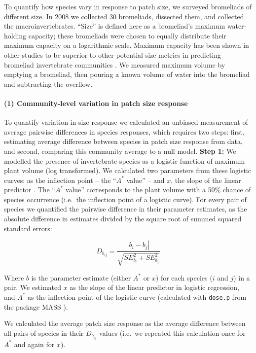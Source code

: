 To quantify how species vary in response to patch size, we surveyed
bromeliads of different size. In 2008 we collected 30 bromeliads,
dissected them, and collected the macroinvertebrates. “Size” is defined here as a bromeliad’s maximum water-holding capacity; these bromeliads
were chosen to equally distribute their maximum capacity on a logarithmic
scale. Maximum capacity has been shown in other
studies to be superior to other potential size metrics in predicting
bromeliad invertebrate communities \citep{Srivastava2008, Marino2011}.
We measured maximum volume by emptying a bromeliad, then pouring a known
volume of water into the bromeliad and subtracting the overflow.

\paragraph{(1) Community-level variation in patch size
response}\label{community-level-variation-in-patch-size-response}

To quantify variation in size response we calculated an unbiased
measurement of average pairwise differences in species responses, which
requires two steps: first, estimating average difference between species
in patch size response from data, and second, comparing this community
average to a null model. \textbf{Step 1:} We modelled the presence of
invertebrate species as a logistic function of maximum plant volume (log
transformed). We calculated two parameters from these logistic curves: as the inflection point -- the
``\(A^{*}\) value'' -- and \(x\), the slope of the linear predictor
\citep{Ovaskainen2003}. The ``\(A^{*}\) value'' corresponds to the plant
volume with a 50\% chance of species occurrence (i.e.~the inflection
point of a logistic curve). For every pair of species we quantified the
pairwise difference in their parameter estimates, as the absolute
difference in estimates divided by the square root of summed squared
standard errors:

\[D_{b_{ij}} = \frac{|b_{i} - b_{j}|}{\sqrt{SE_{b_{i}}^{2} + SE_{b_{j}}^{2}}}\]

Where \(b\) is the parameter estimate (either \(A^{*}\) or \(x\)) for
each species (\(i\) and \(j\)) in a pair. We estimated \(x\) as the
slope of the linear predictor in logistic regression, and \(A^{*}\) as
the inflection point of the logistic curve (calculated with
\texttt{dose.p} from the package MASS \citep{mass}).

We calculated the average patch size response as the average difference
between all pairs of species in their \(D_{b_{ij}}\) values (i.e.~we repeated this calculation once for \(A^{*}\) and again for \(x\)).

